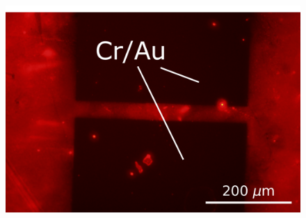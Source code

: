 \documentclass[
  a4paper,
]{scrbook}
\begin{document}
\begin{figure}
\begin{minipage}[t]{0.47\linewidth}
{{\includegraphics{figures/ch7/modified_softbake1minacetonerinse_aptamer_ch3_mCherry_30sexposure_highcontrast_ISO200_12.6X.png}

}

}

\subcaption{\label{fig-aptamer-photoresist-3}}
\end{minipage}%
%
\begin{minipage}[t]{0.05\linewidth}

{\centering 

~

}

\end{minipage}%
%
\begin{minipage}[t]{0.47\linewidth}

{\centering 

}
\end{minipage}
\end{figure}
\end{document}
